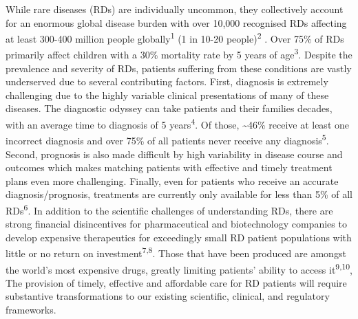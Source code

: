 \documentclass[
sn-nature
]{sn-jnl}
\begin{document}
While rare diseases (RDs) are individually uncommon, they collectively
account for an enormous global disease burden with over 10,000
recognised RDs affecting at least 300-400 million people
globally\textsuperscript{1} (1 in 10-20 people)\textsuperscript{2} .
Over 75\% of RDs primarily affect children with a 30\% mortality rate by
5 years of age\textsuperscript{3}. Despite the prevalence and severity
of RDs, patients suffering from these conditions are vastly underserved
due to several contributing factors. First, diagnosis is extremely
challenging due to the highly variable clinical presentations of many of
these diseases. The diagnostic odyssey can take patients and their
families decades, with an average time to diagnosis of 5
years\textsuperscript{4}. Of those, \textasciitilde46\% receive at least
one incorrect diagnosis and over 75\% of all patients never receive any
diagnosis\textsuperscript{5}. Second, prognosis is also made difficult
by high variability in disease course and outcomes which makes matching
patients with effective and timely treatment plans even more
challenging. Finally, even for patients who receive an accurate
diagnosis/prognosis, treatments are currently only available for less
than 5\% of all RDs\textsuperscript{6}. In addition to the scientific
challenges of understanding RDs, there are strong financial
disincentives for pharmaceutical and biotechnology companies to develop
expensive therapeutics for exceedingly small RD patient populations with
little or no return on investment\textsuperscript{7,8}. Those that have
been produced are amongst the world's most expensive drugs, greatly
limiting patients' ability to access it\textsuperscript{9,10}, The
provision of timely, effective and affordable care for RD patients will
require substantive transformations to our existing scientific,
clinical, and regulatory frameworks.
\end{document}
